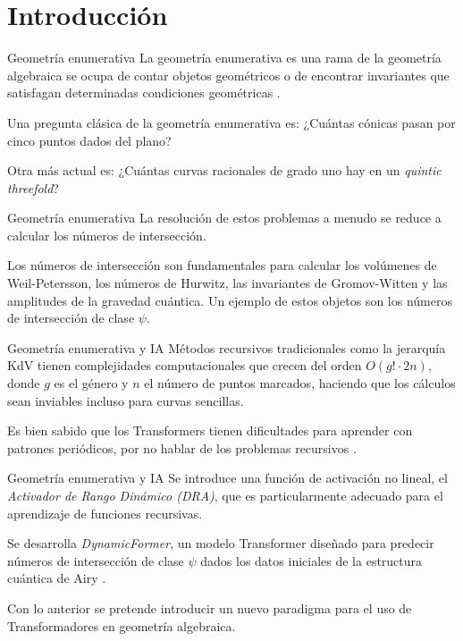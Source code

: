 \documentclass{beamer}
\begin{document}
\section{Introducción}
\begin{frame}{Geometría enumerativa}
    La geometría enumerativa es una rama de la geometría algebraica se ocupa de contar objetos geométricos o de encontrar invariantes que satisfagan determinadas condiciones geométricas \cite{Mumford1983, Katz2006}. 
    \newline
    \pause
    
    Una pregunta clásica de la geometría enumerativa es: ¿Cuántas cónicas pasan por cinco puntos dados del plano?
    \newline
    \pause
    
    Otra más actual es: ¿Cuántas curvas racionales de grado uno hay en un \textit{quintic threefold}? 
\end{frame}

\begin{frame}{Geometría enumerativa}
    La resolución de estos problemas a menudo se reduce a calcular los números de intersección.
    \newline
    \pause
    
    Los números de intersección son fundamentales para calcular los volúmenes de Weil-Petersson, los números de Hurwitz, las invariantes de Gromov-Witten y las amplitudes de la gravedad cuántica. Un ejemplo de estos objetos son los números de intersección de clase $\psi$.
\end{frame}

\begin{frame}{Geometría enumerativa y IA}
    Métodos recursivos tradicionales como la jerarquía KdV \cite{Witten1990, Kontsevich1992} tienen complejidades computacionales que crecen del orden $O(g!\cdot 2n)$, donde $g$ es el género y $n$ el número de puntos marcados, haciendo que los cálculos sean inviables incluso para curvas sencillas. 
    \newline
    \pause
    
    Es bien sabido que los Transformers tienen dificultades para aprender con patrones periódicos, por no hablar de los problemas recursivos \cite{Ziyin2020}.
\end{frame}

\begin{frame}{Geometría enumerativa y IA}
    Se introduce una función de activación no lineal, el \textit{Activador de Rango Dinámico (DRA)}, que es particularmente adecuado para el aprendizaje de funciones recursivas.  
    \newline
    \pause
    
    Se desarrolla \textit{DynamicFormer}, un modelo Transformer diseñado para predecir números de intersección de clase $\psi$ dados los datos iniciales de la estructura cuántica de Airy \cite{Kontsevich2017}. 
    \newline
    \pause
    
   Con lo anterior se pretende introducir un nuevo paradigma para el uso de Transformadores en geometría algebraica.
\end{frame}
\end{document}
